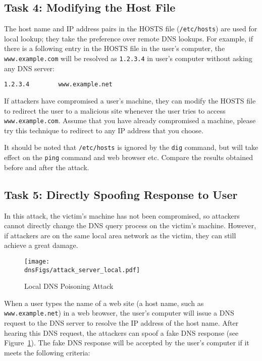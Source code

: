 \subsection{Task 4: Modifying the Host File}


The host name and IP address pairs in the HOSTS file (\texttt{/etc/hosts}) 
are used for local lookup; they take the preference over 
remote DNS lookups. For example, if there is a following 
entry in the HOSTS file in the user's computer, 
the \texttt{www.example.com} will be resolved as \texttt{1.2.3.4} in 
user's computer without asking any DNS server:

\begin{verbatim}
1.2.3.4        www.example.net
\end{verbatim}

If attackers have compromised a user's machine, they can 
modify the HOSTS file to redirect the user to a malicious site
whenever the user tries to access {\tt www.example.com}. Assume that you have 
already compromised a machine, please try this technique to redirect
\wwwbank to any IP address that you choose.

It should be noted that \texttt{/etc/hosts} is ignored by the {\tt dig} command, 
but will take effect on the \texttt{ping} command and web browser etc.
Compare the results obtained before and after the attack. 



\subsection{Task 5: Directly Spoofing Response to User}


In this attack, the victim's machine has not been compromised, so attackers cannot
directly change the DNS query process on the victim's machine. However,
if attackers are on the same local area network as the victim, they 
can still achieve a great damage. 

\begin{figure}[htb]
\centering
\texttt{[image: \\dnsFigs/attack\_server\_local.pdf]}
\caption{Local DNS Poisoning Attack}
\label{dns:fig:local_attack}
\end{figure}


When a user types the name of a web site (a host name, such as {\tt
www.example.net})
in a web browser, the user's computer will issue a DNS request to the DNS 
server to resolve the IP address of the host name.  After hearing this DNS 
request, the attackers can spoof a fake DNS response (see
Figure~\ref{dns:fig:local_attack}). 
The fake DNS response 
will be accepted by the user's computer if it meets 
the following criteria:

